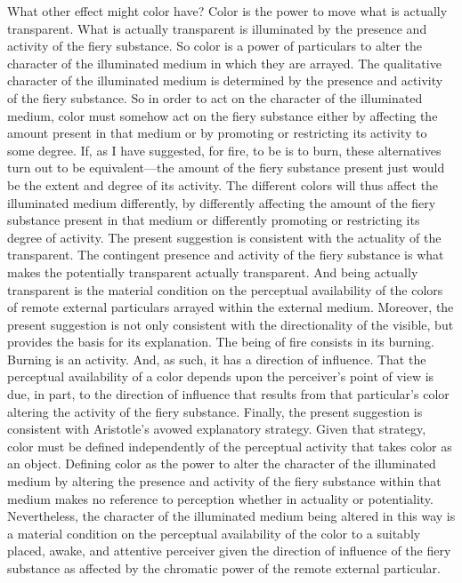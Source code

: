 What other effect might color have? Color is the power to move what is actually transparent. What is actually transparent is illuminated by the presence and activity of the fiery substance. So color is a power of particulars to alter the character of the illuminated medium in which they are arrayed. The qualitative character of the illuminated medium is determined by the presence and activity of the fiery substance. So in order to act on the character of the illuminated medium, color must somehow act on the fiery substance either by affecting the amount present in that medium or by promoting or restricting its activity to some degree. If, as I have suggested, for fire, to be is to burn, these alternatives turn out to be equivalent---the amount of the fiery substance present just would be the extent and degree of its activity. The different colors will thus affect the illuminated medium differently, by differently affecting the amount of the fiery substance present in that medium or differently promoting or restricting its degree of activity. The present suggestion is consistent with the actuality of the transparent. The contingent presence and activity of the fiery substance is what makes the potentially transparent actually transparent. And being actually transparent is the material condition on the perceptual availability of the colors of remote external particulars arrayed within the external medium. Moreover, the present suggestion is not only consistent with the directionality of the visible, but provides the basis for its explanation. The being of fire consists in its burning. Burning is an activity. And, as such, it has a direction of influence. That the perceptual availability of a color depends upon the perceiver's point of view is due, in part, to the direction of influence that results from that particular's color altering the activity of the fiery substance. Finally, the present suggestion is consistent with Aristotle's avowed explanatory strategy. Given that strategy, color must be defined independently of the perceptual activity that takes color as an object. Defining color as the power to alter the character of the illuminated medium by altering the presence and activity of the fiery substance within that medium makes no reference to perception whether in actuality or potentiality. Nevertheless, the character of the illuminated medium being altered in this way is a material condition on the perceptual availability of the color to a suitably placed, awake, and attentive perceiver given the direction of influence of the fiery substance as affected by the chromatic power of the remote external particular.

